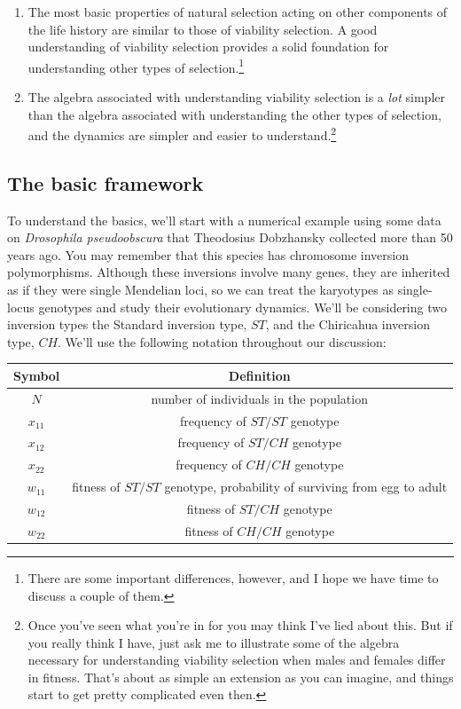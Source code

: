 \begin{enumerate}

\item The most basic properties of natural selection acting on other
  components of the life history are similar to those of viability
  selection. A good understanding of viability selection provides a
  solid foundation for understanding other types of
  selection.\footnote{There are some important differences, however,
    and I hope we have time to discuss a couple of them.}

\item The algebra associated with understanding viability selection is
  a {\it lot\/} simpler than the algebra associated with understanding
  the other types of selection, and the dynamics are simpler and
  easier to understand.\footnote{Once you've seen what you're in for
    you may think I've lied about this. But if you really think I
    have, just ask me to illustrate some of the algebra necessary for
    understanding viability selection when males and females differ in
    fitness. That's about as simple an extension as you can imagine,
    and things start to get pretty complicated even then.}

\end{enumerate}

\subsection*{The basic framework}

To understand the basics, we'll start with a numerical example using
some data on {\it Drosophila pseudoobscura\/} that Theodosius
Dobzhansky collected more than 50 years ago. You may remember that
this species has chromosome inversion polymorphisms. Although these
inversions involve many genes, they are inherited as if they were
single Mendelian loci, so we can treat the karyotypes as single-locus
genotypes and study their evolutionary dynamics. We'll be considering
two inversion types the Standard inversion type, $ST$, and the
Chiricahua inversion type, $CH$. We'll use the following notation
throughout our discussion:

\begin{center}
\begin{tabular}{cc}
\hline\hline
Symbol  & Definition \\
\hline
$N$      & number of individuals in the population \\
$x_{11}$ & frequency of $ST/ST$ genotype \\
$x_{12}$ & frequency of $ST/CH$ genotype \\
$x_{22}$ & frequency of $CH/CH$ genotype \\
$w_{11}$ & fitness of $ST/ST$ genotype, probability of surviving from
           egg to adult \\
$w_{12}$ & fitness of $ST/CH$ genotype \\
$w_{22}$ & fitness of $CH/CH$ genotype \\
\hline
\end{tabular}
\end{center}

